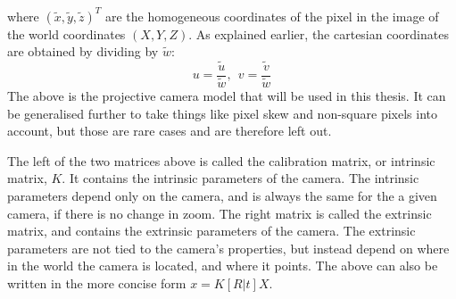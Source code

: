 where $(\tilde{x},\tilde{y},\tilde{z})^T$ are the homogeneous coordinates of the pixel in the image of the world coordinates $(X,Y,Z)$.
As explained earlier, the cartesian coordinates are obtained by dividing by $\tilde{w}$:
$$
u = \frac{\tilde{u}}{\tilde{w}},~~v = \frac{\tilde{v}}{\tilde{w}}
$$
The above is the projective camera model that will be used in this thesis. 
It can be generalised further to take things like pixel skew and non-square pixels into account, but those are rare cases and are therefore left out.

The left of the two matrices above is called the calibration matrix, or intrinsic matrix, $K$.
It contains the intrinsic parameters of the camera.
The intrinsic parameters depend only on the camera, and is always the same for the a given camera, if there is no change in zoom.
The right matrix is called the extrinsic matrix, and contains the extrinsic parameters of the camera.
The extrinsic parameters are not tied to the camera's properties, but instead depend on where in the world the camera is located, and where it points.
The above can also be written in the more concise form $x = K[R|t]X$.

